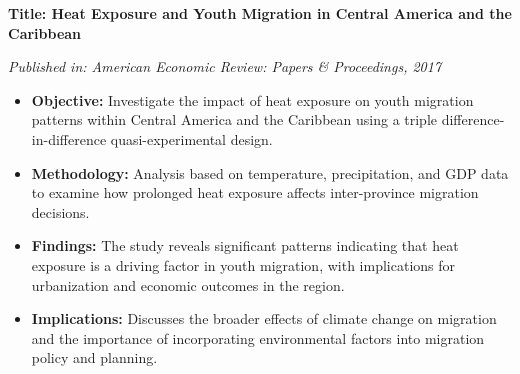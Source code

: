 \documentclass{article}
\begin{document}
\textbf{Title: Heat Exposure and Youth Migration in Central America and the Caribbean} 

\textit{Published in: American Economic Review: Papers \& Proceedings, 2017} 

\begin{itemize}
\item \textbf{Objective:} Investigate the impact of heat exposure on youth migration patterns within Central America and the Caribbean using a triple difference-in-difference quasi-experimental design.
\item \textbf{Methodology:} Analysis based on temperature, precipitation, and GDP data to examine how prolonged heat exposure affects inter-province migration decisions.
\item \textbf{Findings:} The study reveals significant patterns indicating that heat exposure is a driving factor in youth migration, with implications for urbanization and economic outcomes in the region.
\item \textbf{Implications:} Discusses the broader effects of climate change on migration and the importance of incorporating environmental factors into migration policy and planning.
\end{itemize}
\end{document}
